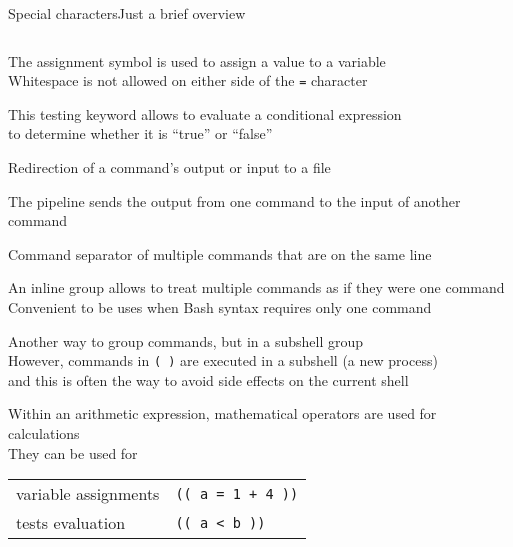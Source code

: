 \begin{frame}[fragile]{Special characters}{Just a brief overview}
\begin{columns}
\begin{column}{\dimexpr\paperwidth-10mm}
\begin{description}[\texttt{>  >>  <}]
                \item<only@2>[\texttt{=}]
                    The \alert{assignment} symbol is used to assign a value to a variable \\
                    Whitespace is not allowed on either side of the \texttt{=} character
                \item<only@2>[\texttt{[[ ]]}]
                    This \alert{testing keyword} allows to evaluate a conditional expression \\
                    to determine whether it is ``true'' or ``false''
                \item<only@2>[\texttt{>  >>  <}]
                    \alert{Redirection} of a command's output or input to a file
                \item<only@2>[\texttt{|}]
                    The \alert{pipeline} sends the output from one command to the input of another command
                \item<only@2>[\texttt{;}]
                    \alert{Command separator} of multiple commands that are on the same line
                \item<only@2>[\texttt{\{ \}}]
                    An \alert{inline group} allows to treat multiple commands as if they were one command
                    Convenient to be uses when Bash syntax requires only one command
                \item<only@2>[\texttt{( )}]
                    Another way to group commands, but in a \alert{subshell group} \\
                    However, commands in \texttt{( )} are executed in a subshell (a new process) \\
                    and this is often the way to avoid side effects on the current shell
                \item<only@3-4>[\texttt{(( ))}]
                     Within an \alert{arithmetic expression}, mathematical operators are used for calculations \\
                     They can be used for\\
                     \begin{tabular}{ll}
                        \PB{$\bullet\;$} variable assignments   & \texttt{(( a = 1 + 4 ))}  \\
                        \PB{$\bullet\;$} tests evaluation       & \texttt{(( a < b ))}      \\
                    \end{tabular}

\end{description}
\end{column}
\end{columns}
\end{frame}

